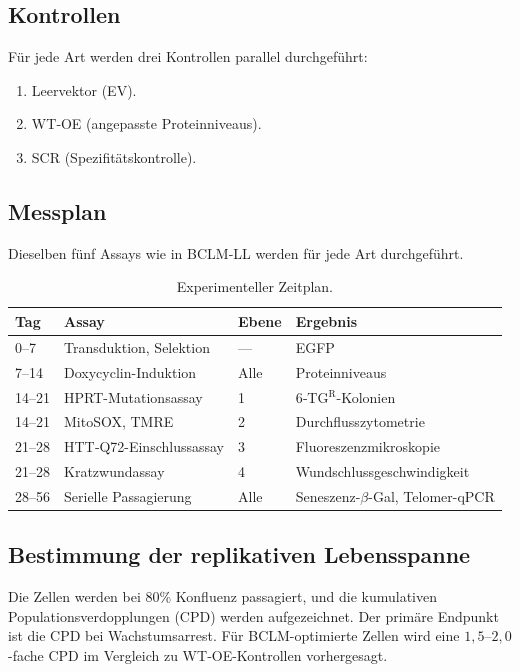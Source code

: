 \documentclass[12pt,a4paper]{article}
\begin{document}
	\subsection{Kontrollen}
	Für jede Art werden drei Kontrollen parallel durchgeführt:
	\begin{enumerate}
		\item Leervektor (EV).
		\item WT‑OE (angepasste Proteinniveaus).
		\item SCR (Spezifitätskontrolle).
	\end{enumerate}
	
	\subsection{Messplan}
	Dieselben fünf Assays wie in BCLM‑LL werden für jede Art durchgeführt.
	
	\begin{table}[H]
		\centering
		\caption{Experimenteller Zeitplan.}
		\label{tab:schedule}
		\begin{tabular}{@{}llll@{}}
			\toprule
			\textbf{Tag} & \textbf{Assay} & \textbf{Ebene} & \textbf{Ergebnis} \\
			\midrule
			0–7   & Transduktion, Selektion & --- & EGFP \\
			7–14  & Doxycyclin-Induktion & Alle & Proteinniveaus \\
			14–21 & HPRT-Mutationsassay & 1 & 6‑TG\(^{\mathrm{R}}\)-Kolonien \\
			14–21 & MitoSOX, TMRE & 2 & Durchflusszytometrie \\
			21–28 & HTT‑Q72-Einschlussassay & 3 & Fluoreszenzmikroskopie \\
			21–28 & Kratzwundassay & 4 & Wundschlussgeschwindigkeit \\
			28–56 & Serielle Passagierung & Alle & Seneszenz-\(\beta\)-Gal, Telomer-qPCR \\
			\bottomrule
		\end{tabular}
	\end{table}
	
	\subsection{Bestimmung der replikativen Lebensspanne}
	Die Zellen werden bei 80\% Konfluenz passagiert, und die kumulativen Populationsverdopplungen (CPD) werden aufgezeichnet. Der primäre Endpunkt ist die CPD bei Wachstumsarrest. Für BCLM-optimierte Zellen wird eine \(1,5\)–\(2,0\)-fache CPD im Vergleich zu WT‑OE-Kontrollen vorhergesagt.
	
\end{document}
